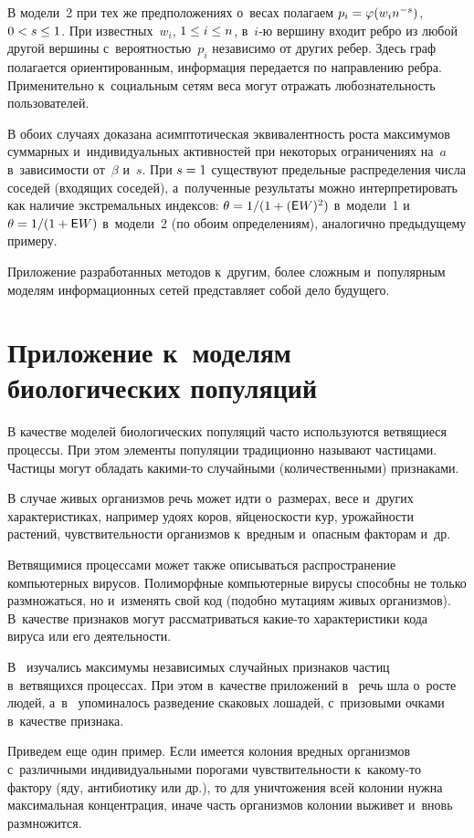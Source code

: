 \begin{multicols}{2}
В модели~2 при тех же предположениях о~весах полагаем $p_i\hm=
\varphi(w_in^{-s})$, $0\hm<s\hm\le 1$.
При известных~$w_i$, $1\hm\le i\hm\le n$, в~$i$-ю вершину входит реб\-ро из любой другой вершины
с~вероятностью~$p_i$ независимо от других ребер. Здесь граф полагается ориентированным,
информация передается по направлению реб\-ра. Применительно
к~социальным сетям веса могут отражать любознательность пользователей.

В обоих случаях доказана асимптотическая эквивалентность роста
максимумов суммарных и~индивидуальных активностей при некоторых ограничениях
на~$a$ в~зависимости от~$\beta$ и~$s$.
При $s\hm=1$ существуют предельные распределения числа соседей (входящих соседей),
а~полученные результаты можно интерпретировать как наличие экстремальных индексов:
$\theta\hm=1/(1\hm+({\sf E}W)^2)$
в~модели~1 и~$\theta\hm=1/(1\hm+{\sf E}W)$ в~модели~2
(по обоим определениям), аналогично предыдущему примеру.

Приложение разработанных методов к~другим, более сложным и~популярным
моделям информационных сетей представляет собой дело будущего.

\section{Приложение к~моделям биологических популяций}

В качестве моделей биологических популяций часто используются ветвящиеся процессы.
При этом элементы популяции традиционно называют частицами. Частицы могут обладать
ка\-ки\-ми-то случайными (количественными) признаками.

В случае живых организмов речь может идти о~размерах, весе и~других характеристиках, например
удоях коров, яйценоскости кур, урожайности растений, чувствительности организмов к~вредным
и~опасным факторам и~др.

Ветвящимися процессами может также описываться распространение компьютерных вирусов.
Полиморфные компьютерные вирусы способны не только размножаться, но и~изменять свой код
(подобно мутациям живых организмов). В~качестве признаков могут рассматриваться ка\-кие-то
характеристики кода вируса или его деятельности.

В~\cite{AV, Pakes} изучались максимумы независимых случайных признаков частиц
в~ветвящихся
процессах. При этом в~качестве приложений в~\cite{AV} речь шла о~росте людей,
а~в~\cite{Pakes}
упоминалось разведение скаковых лошадей, с~призовыми очками в~качестве признака.

Приведем еще один пример. Если имеется колония вредных организмов с~различными
индивидуальными порогами чувствительности к~ка\-ко\-му-то фактору (яду, антибиотику или др.),
то для
уничтожения всей колонии нужна максимальная концентрация, иначе часть организмов
колонии выживет и~вновь размножится.


\end{multicols}
